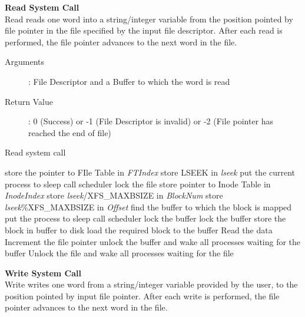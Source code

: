 \documentclass[10pt]{article}
\begin{document}
\textbf{Read System Call}\\
Read reads one word into a string/integer variable from the position pointed by file pointer in the file specified by the input file descriptor. After each read is performed, the file pointer advances to the next word in the file. 
\begin{description}
	\item[Arguments]: File Descriptor and a Buffer to which the word is read
	\item[Return Value]: 0 (Success) or -1 (File Descriptor is invalid) or -2 (File pointer has reached the end of file)
\end{description} 
\begin{algorithm}
\caption{Read system call}
\begin{algorithmic}
\ENDIF
{}
\ELSE 
    \STATE store the pointer to FIle Table in  \textit{FTIndex}
    \STATE store LSEEK in  \textit{lseek}
\ENDIF
{}
    \STATE put the current process to sleep
    \STATE call scheduler
\ENDWHILE
\STATE lock the file
\STATE store pointer to Inode Table in  \textit{InodeIndex}
\ELSE 
    \STATE store \textit{lseek}/XFS\_MAXBSIZE in \textit{BlockNum}
    \STATE store \textit{lseek}\%XFS\_MAXBSIZE in \textit{Offset}
\ENDIF
\STATE find the buffer to which the block is mapped
            \STATE put the process to sleep
            \STATE call scheduler
        \ENDWHILE
        \STATE lock the buffer
    \ENDIF
\ELSE
    \STATE lock the buffer
\ENDIF
{}
        \STATE store the block in buffer to disk
    \ENDIF
    \STATE load the required block to the buffer
\ENDIF
\STATE Read the data
\STATE Increment the file pointer
\STATE unlock the buffer and wake all processes waiting for the buffer
\STATE Unlock the file and wake all processes waiting for the file
\end{algorithmic}
\end{algorithm}
\textbf{Write System Call}\\
Write writes one word from a string/integer variable provided by the user, to the position pointed by input file pointer. After each write is performed, the file pointer advances to the next word in the file.
\end{document}
